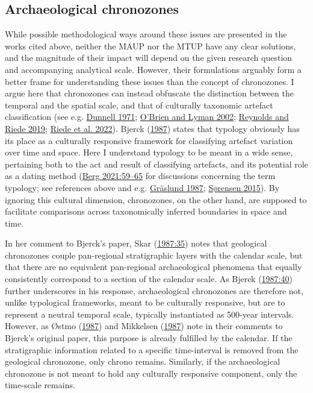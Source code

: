 \documentclass[
  12pt,
  a4paper,
  oneside]{book}
\begin{document}
\hypertarget{archaeological-chronozones}{%
\subsection{Archaeological chronozones}\label{archaeological-chronozones}}

While possible methodological ways around these issues are presented in the works cited above, neither the MAUP nor the MTUP have any clear solutions, and the magnitude of their impact will depend on the given research question and accompanying analytical scale. However, their formulations arguably form a better frame for understanding these issues than the concept of chronozones. I argue here that chronozones can instead obfuscate the distinction between the temporal and the spatial scale, and that of culturally taxonomic artefact classification (see e.g. \protect\hyperlink{ref-dunnell1971}{Dunnell 1971}; \protect\hyperlink{ref-obrien2002}{O'Brien and Lyman 2002}; \protect\hyperlink{ref-reynolds2019}{Reynolds and Riede 2019}; \protect\hyperlink{ref-riede2022}{Riede et al. 2022}). Bjerck (\protect\hyperlink{ref-bjerck1987}{1987}) states that typology obviously has its place as a culturally responsive framework for classifying artefact variation over time and space. Here I understand typology to be meant in a wide sense, pertaining both to the act and result of classifying artefacts, and its potential role as a dating method (\protect\hyperlink{ref-berg2021}{Berg 2021:59--65} for discussions concerning the term typology; see references above and e.g. \protect\hyperlink{ref-graslund1987}{Gräslund 1987}; \protect\hyperlink{ref-suxf8rensen2015}{Sørensen 2015}). By ignoring this cultural dimension, chronozones, on the other hand, are supposed to facilitate comparisons across taxonomically inferred boundaries in space and time.

In her comment to Bjerck's paper, Skar (\protect\hyperlink{ref-skar1987}{1987:35}) notes that geological chronozones couple pan-regional stratigraphic layers with the calendar scale, but that there are no equivalent pan-regional archaeological phenomena that equally consistently correspond to a section of the calendar scale. As Bjerck (\protect\hyperlink{ref-bjerck1987}{1987:40}) further underscores in his response, archaeological chronozones are therefore not, unlike typological frameworks, meant to be culturally responsive, but are to represent a neutral temporal scale, typically instantiated as 500-year intervals. However, as Østmo (\protect\hyperlink{ref-uxf8stmo1987}{1987}) and Mikkelsen (\protect\hyperlink{ref-mikkelsen1987}{1987}) note in their comments to Bjerck's original paper, this purpose is already fulfilled by the calendar. If the stratigraphic information related to a specific time-interval is removed from the geological chronozone, only \textquotesingle chrono\textquotesingle{} remains. Similarly, if the archaeological chronozone is not meant to hold any culturally responsive component, only the time-scale remains.
\end{document}
